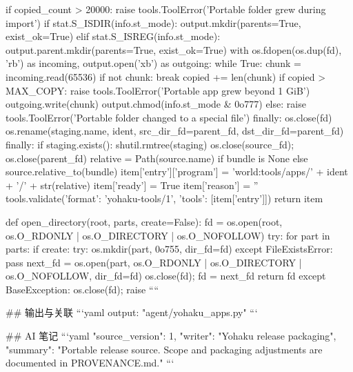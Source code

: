                if copied_count > 20000:
                    raise tools.ToolError('Portable folder grew during import')
                if stat.S_ISDIR(info.st_mode):
                    output.mkdir(parents=True, exist_ok=True)
                elif stat.S_ISREG(info.st_mode):
                    output.parent.mkdir(parents=True, exist_ok=True)
                    with os.fdopen(os.dup(fd), 'rb') as incoming, output.open('xb') as outgoing:
                        while True:
                            chunk = incoming.read(65536)
                            if not chunk: break
                            copied += len(chunk)
                            if copied > MAX_COPY: raise tools.ToolError('Portable app grew beyond 1 GiB')
                            outgoing.write(chunk)
                    output.chmod(info.st_mode & 0o777)
                else:
                    raise tools.ToolError('Portable folder changed to a special file')
            finally:
                os.close(fd)
        os.rename(staging.name, ident, src_dir_fd=parent_fd, dst_dir_fd=parent_fd)
    finally:
        if staging.exists(): shutil.rmtree(staging)
        os.close(source_fd); os.close(parent_fd)
    relative = Path(source.name) if bundle is None else source.relative_to(bundle)
    item['entry']['program'] = 'world:tools/apps/' + ident + '/' + str(relative)
    item['ready'] = True
    item['reason'] = ''
    tools.validate({'format': 'yohaku-tools/1', 'tools': [item['entry']]})
    return item


def open_directory(root, parts, create=False):
    fd = os.open(root, os.O_RDONLY | os.O_DIRECTORY | os.O_NOFOLLOW)
    try:
        for part in parts:
            if create:
                try: os.mkdir(part, 0o755, dir_fd=fd)
                except FileExistsError: pass
            next_fd = os.open(part, os.O_RDONLY | os.O_DIRECTORY | os.O_NOFOLLOW, dir_fd=fd)
            os.close(fd); fd = next_fd
        return fd
    except BaseException:
        os.close(fd); raise
````

## 输出与关联
```yaml
output: "agent/yohaku_apps.py"
```

## AI 笔记
```yaml
{"source_version": 1, "writer": "Yohaku release packaging", "summary": "Portable release source. Scope and packaging adjustments are documented in PROVENANCE.md."}
```
